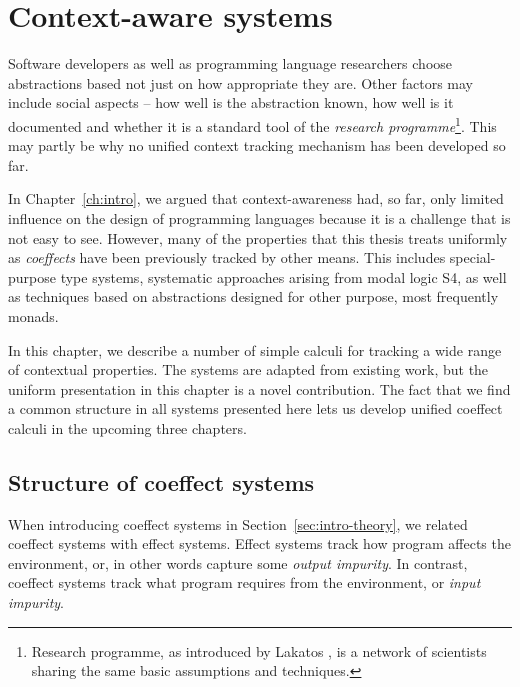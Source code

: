 
\chapter{Context-aware systems} 
\label{ch:applications} 

Software developers as well as programming language researchers choose abstractions based not 
just on how appropriate they are. Other factors may include social aspects -- how well is the 
abstraction known, how well is it documented and whether it is a standard tool of the 
\emph{research programme}\footnote{ Research programme, as introduced by Lakatos \cite{philosophy-lakatos},
is a network of scientists sharing the same basic assumptions and techniques.}. This may
partly be why no unified context tracking mechanism has been developed so far.

In Chapter~\ref{ch:intro}, we argued that context-awareness had, so far, only limited influence 
on the design of programming languages because it is a challenge that is not easy to
see. However, many of the properties that this thesis treats uniformly as \emph{coeffects} have been
previously tracked by other means. This includes special-purpose type systems, systematic 
approaches arising from modal logic S4, as well as techniques based on abstractions designed 
for other purpose, most frequently monads.

In this chapter, we describe a number of simple calculi for tracking a wide range of contextual
properties. The systems are adapted from existing work, but the uniform presentation in this 
chapter is a novel contribution. The fact that we find a common structure in all systems presented 
here lets us develop unified coeffect calculi in the upcoming three chapters.


\section{Structure of coeffect systems}

When introducing coeffect systems in Section~\ref{sec:intro-theory}, we related coeffect systems
with effect systems. Effect systems track how program affects the environment, or, in other words 
capture some \emph{output impurity}. In contrast, coeffect systems track what program requires from the 
environment, or \emph{input impurity}.


